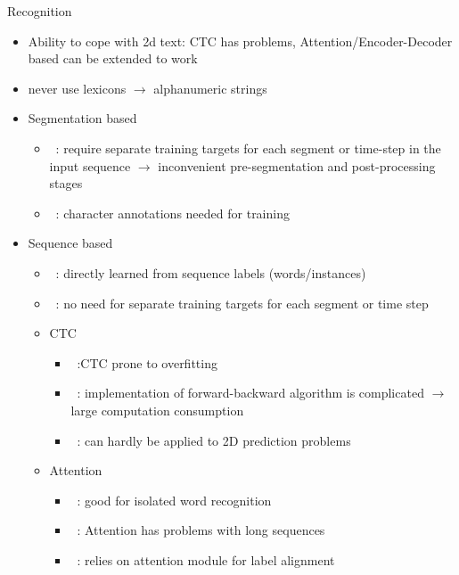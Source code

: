 Recognition
\begin{itemize}
    \item Ability to cope with 2d text:
        CTC has problems,
        Attention/Encoder-Decoder based can be extended to work
    \item never use lexicons $\rightarrow$ alphanumeric strings
    \item Segmentation based
        \begin{itemize}
            \item~\cite{xie_aggregation_2019}: require separate training targets for each segment
                or time-step in the input sequence $\rightarrow$ inconvenient pre-segmentation and
                post-processing stages
            \item~\cite{shi_end--end_2017}: character annotations needed for training
        \end{itemize}
    \item Sequence based
        \begin{itemize}
            \item~\cite{shi_end--end_2017}: directly learned from sequence labels (words/instances)
            \item~\cite{xie_aggregation_2019}: no need for separate training targets for each segment
                or time step
            \item CTC
                \begin{itemize}
                    \item~\cite{chen_text_2021}:CTC prone to overfitting
                    \item~\cite{xie_aggregation_2019}: implementation of forward-backward algorithm
                        is complicated $\rightarrow$ large computation consumption
                    \item~\cite{xie_aggregation_2019}: can hardly be applied to 2D prediction
                        problems
                \end{itemize}
            \item Attention
                \begin{itemize}
                    \item~\cite{chen_text_2021}: good for isolated word recognition
                    \item~\cite{chen_text_2021}: Attention has problems with long sequences
                    \item~\cite{xie_aggregation_2019}: relies on attention module for label alignment

\end{itemize}
\end{itemize}
\end{itemize}
